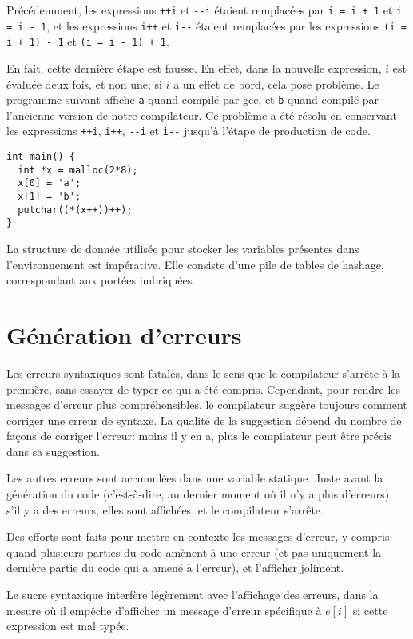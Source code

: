 \documentclass{scrartcl}
\begin{document}
Précédemment, les expressions \verb|++i| et \verb|--i|
étaient remplacées par \verb|i = i + 1| et \verb|i = i - 1|, et les expressions \verb|i++| et \verb|i--| étaient remplacées
par les expressions \verb|(i = i + 1) - 1| et \verb|(i = i - 1) + 1|.\par
En fait, cette dernière étape est fausse. En effet, dans la nouvelle expression,
\(i\) est évaluée deux fois, et non une; si \(i\) a un effet de bord, cela pose
problème. Le programme suivant affiche \verb|a| quand compilé par gcc, et
\verb|b| quand compilé par l'ancienne version de notre compilateur. Ce problème a été résolu
en conservant les expressions \verb|++i|, \verb|i++|, \verb|--i| et \verb|i--| jusqu'à l'étape de production de code.
\begin{verbatim}
int main() {
  int *x = malloc(2*8);
  x[0] = 'a';
  x[1] = 'b';
  putchar((*(x++))++);
}
\end{verbatim}\par
La structure de donnée utilisée pour stocker les variables présentes dans
l'environnement est impérative. Elle consiste d'une pile de tables de hashage,
correspondant aux portées imbriquées.

\section*{Génération d'erreurs}
Les erreurs syntaxiques sont fatales, dans le sens que le compilateur s'arrête
à la première, sans essayer de typer ce qui a été compris. Cependant, pour rendre
les messages d'erreur plus compréhensibles, le compilateur suggère toujours
comment corriger une erreur de syntaxe. La qualité de la suggestion dépend du
nombre de façons de corriger l'erreur: moins il y en a, plus le compilateur peut
être précis dans sa suggestion.\par
Les autres erreurs sont accumulées dans une variable statique. Juste avant la génération
du code (c'est-à-dire, au dernier moment où il n'y a plus d'erreurs), s'il y a
des erreurs, elles sont affichées, et le compilateur s'arrête.\par
Des efforts sont faits pour mettre en contexte les messages d'erreur, y compris
quand plusieurs parties du code amènent à une erreur (et pas uniquement la
dernière partie du code qui a amené à l'erreur), et l'afficher joliment.\par
Le sucre syntaxique interfère légèrement avec l'affichage des erreurs, dans la
mesure où il empêche d'afficher un message d'erreur spécifique à \(e[i]\) si
cette expression est mal typée.
\end{document}
